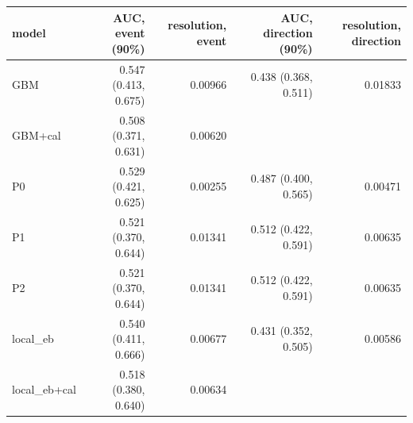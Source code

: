 \begin{tabular}{lrrrr}
\toprule
model & AUC, event (90\%) & resolution, event & AUC, direction (90\%) & resolution, direction \\
\midrule
GBM & 0.547 (0.413, 0.675) & 0.00966 & 0.438 (0.368, 0.511) & 0.01833 \\
GBM+cal & 0.508 (0.371, 0.631) & 0.00620 &  &  \\
P0 & 0.529 (0.421, 0.625) & 0.00255 & 0.487 (0.400, 0.565) & 0.00471 \\
P1 & 0.521 (0.370, 0.644) & 0.01341 & 0.512 (0.422, 0.591) & 0.00635 \\
P2 & 0.521 (0.370, 0.644) & 0.01341 & 0.512 (0.422, 0.591) & 0.00635 \\
local\_eb & 0.540 (0.411, 0.666) & 0.00677 & 0.431 (0.352, 0.505) & 0.00586 \\
local\_eb+cal & 0.518 (0.380, 0.640) & 0.00634 &  &  \\
\bottomrule
\end{tabular}
